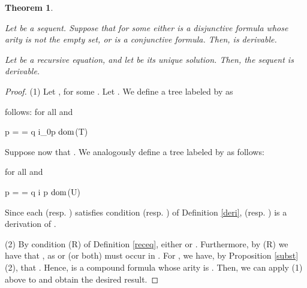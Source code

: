 \documentclass[copyright,creativecommons]{eptcs}
\newcommand{\vv}{\langle}
\newcommand{\ww}{\rangle}
\newcommand{\dom}{\ensuremath{\textnormal{dom}}}
\newtheorem{theorem}{Theorem}[section]   \newtheorem{lemma}[theorem]{Lemma}
\theoremstyle{definition}
\newcommand{\squishlist}{
 \begin{list}{}
  { \setlength{\itemsep}{0pt}
     \setlength{\parsep}{3pt}
     \setlength{\topsep}{3pt}
     \setlength{\partopsep}{0pt}
     \setlength{\leftmargin}{1em}
     \setlength{\labelwidth}{1.5em}
     \setlength{\labelsep}{0.5em} } }
\newcommand{\squishend}{
  \end{list}  }
\newcommand{\sqi}{
 \begin{list}{}
  { \setlength{\itemsep}{0pt}
     \setlength{\parsep}{3pt}
     \setlength{\topsep}{3pt}
     \setlength{\partopsep}{0pt}
     \setlength{\leftmargin}{1.4em}
     \setlength{\labelwidth}{1.5em}
     \setlength{\labelsep}{0.3em} } }
\newcommand{\sqe}{
  \end{list}  }
\begin{document}
 \begin{theorem} \label{propder} \label{recder} \hfill
 \sqi
 \item[\emph{(1)}]
 Let \/\@ be a sequent. Suppose that for some  \/\@  either
 \/\@ is a disjunctive formula whose arity is not the empty set,  or  \/\@ is a conjunctive formula.
Then,  \/\@ is derivable.
\item[\emph{(2)}] Let  \/\@ be a recursive equation, and
let \/\@ be its  unique solution.
Then, the sequent
\/\@ is
derivable.
\sqe
 \end{theorem}
 \begin{proof} (1)
Let , for some
. Let
. We define a tree  labeled by
 as \linebreak

\vspace{-0.45cm}
\noindent follows:
 for all  and



\squishlist
\item[] {\centering
 p = \roop = q \star \vv i_0\ww p \in \dom(T) \par}
\squishend
\noindent
Suppose now that .  We analogously define a tree  labeled by
 as follows: \linebreak

 \vspace{-0.45cm}
\noindent
 for all  and


\squishlist
\item[] {\centering
 p = \roop = q \star \vv i \ww p \in \dom(U) \par}
\squishend
Since each  (resp. )
satisfies condition
  (resp. ) of Definition \ref{deri},
  (resp. )   is a derivation of .


(2) By condition (R) of Definition \ref{receq}, either  or . Furthermore, by
 (R) we have that
, as  or  (or both)
must occur in .
For ,  we have, by  Proposition \ref{subst}(2), that
  . Hence,  is a compound formula whose arity is .
Then, we can apply (1) above to 
and obtain the desired result.
     \end{proof}
\end{document}
